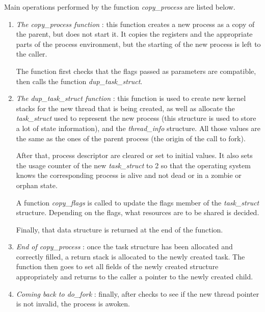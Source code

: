 \documentclass[a4paper, 12pt]{article}
\begin{document}
    Main operations performed by the function \emph{copy\_process} are listed below.
    
    \begin{enumerate}
        \item \emph{The copy\_process function} : this function creates a new process as a copy of the parent, but does not start it. It copies the registers and the appropriate parts of the process environment, but the starting of the new process is left to the caller.
        
        The function first checks that the flags passed as parameters are compatible, then calls the function \emph{dup\_task\_struct}.
        
        \item\label{memory.step} \emph{The dup\_task\_struct function} : this function is used to create new kernel stacks for the new thread that is being created, as well as allocate the \emph{task\_struct} used to represent the new process (this structure is used to store a lot of state information), and the \emph{thread\_info} structure. All those values are the same as the ones of the parent process (the origin of the call to fork).
        
        After that, process descriptor are cleared or set to initial values. It also sets the usage counter of the new \emph{task\_struct} to 2 so that the operating system knows the corresponding process is alive and not dead or in a zombie or orphan state.
        
        A function \emph{copy\_flags} is called to update the flags member of the \emph{task\_struct} structure. Depending on the flags, what resources are to be shared is decided.
        
        Finally, that data structure is returned at the end of the function.
        
        \item \emph{End of copy\_process} : once the task structure has been allocated and correctly filled, a return stack is allocated to the newly created task. The function then goes to set all fields of the newly created structure appropriately and returns to the caller a pointer to the newly created child.
        
        \item \emph{Coming back to do\_fork} : finally, after checks to see if the new thread pointer is not invalid, the process is awoken.
    \end{enumerate}
    
\end{document}

